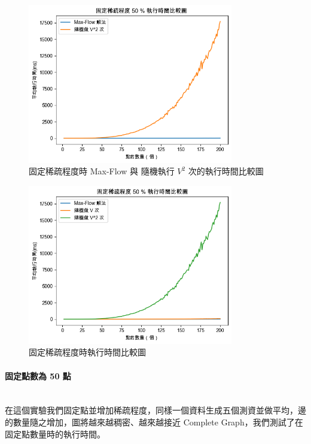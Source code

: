 \documentclass[12pt]{article}
\begin{document}
	\begin{figure}[H]
		\centering
		\includegraphics[width=0.8\textwidth]{img/img1}
		\caption{固定稀疏程度時 Max-Flow 與 隨機執行 $V^2$ 次的執行時間比較圖}
		\label{Fig.1}
	\end{figure}
		\begin{figure}[H]
		\centering
		\includegraphics[width=0.8\textwidth]{img/img2}
		\caption{固定稀疏程度時執行時間比較圖}
		\label{Fig.2}
	\end{figure}

	\paragraph{固定點數為 50 點}  \leavevmode \\
	
	在這個實驗我們固定點並增加稀疏程度，同樣一個資料生成五個測資並做平均，邊的數量隨之增加，圖將越來越稠密、越來越接近 Complete Graph，我們測試了在固定點數量時的執行時間。\\
	
\end{document}
